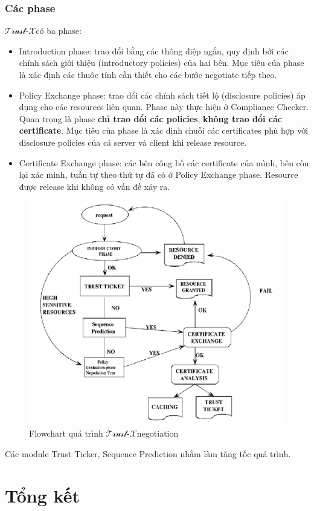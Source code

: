 \documentclass[12pt]{article}
\newcommand{\trustx}{$\mathcal{\text{Trust-}X}$}
\begin{document}
\subsubsection{Các phase}
\trustx có ba phase:
\begin{itemize}
\item Introduction phase: trao đổi bằng các thông điệp ngắn, quy định bởi các chính sách giới thiệu (introductory policies) của hai bên. Mục tiêu của phase là xác định các thuôc tính cần thiết cho các bước negotiate tiếp theo.
\item Policy Exchange phase: trao đổi các chính sách tiết lộ (disclosure policies) áp dụng cho các resources liên quan. Phase này thực hiện ở Compliance Checker. Quan trọng là phase \textbf{chỉ trao đổi các policies}, \textbf{không trao đổi các certificate}. Mục tiêu của phase là xác định chuỗi các certificates phù hợp với disclosure policies của cả server và client khi release resource.
\item Certificate Exchange phase: các bên công bố các certificate của mình, bên còn lại xác minh, tuần tự theo thứ tự đã có ở Policy Exchange phase. Resource được release khi không có vấn đề xảy ra.
\end{itemize}

\begin{figure}[H]
\centering
\includegraphics[scale=.8]{img/trustx-architecture.png}
\caption{Flowchart quá trình \trustx negotiation}
\end{figure}

Các module Trust Ticker, Sequence Prediction nhằm làm tăng tốc quá trình.

\section{Tổng kết}




\end{document}
